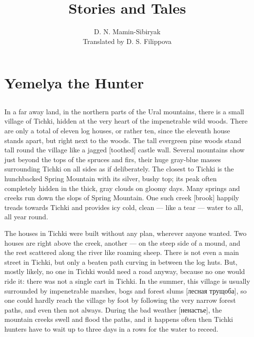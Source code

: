 \documentclass[b5paper,12pt,openany]{book}
\begin{document}
\title{Stories and Tales}
\author{D. N. Mamin-Sibiryak \\ Translated by D. S. Filippova}

\maketitle

\chapter{Yemelya the Hunter}

\section{}

In a far away land, in the northern parts of the Ural mountains, there is a small village of Tichki, hidden at the very heart of the impenetrable wild woods. There are only a total of eleven log houses, or rather ten, since the eleventh house stands apart, but right next to the woods.
The tall evergreen pine woods stand tall round the village like a jagged [toothed] castle wall.
Several mountains show just beyond the tops of the spruces and firs, their huge gray-blue masses  surrounding Tichki on all sides as if deliberately. The closest to Tichki is the hunchbacked Spring Mountain with its silver, bushy top; its peak often completely hidden in the thick, gray clouds on gloomy days. Many springs and creeks run down the slops of Spring Mountain. One such creek [brook] happily treads towards Tichki and provides icy cold, clean --- like a tear --- water to all, all year round.

The houses in Tichki were built without any plan, wherever anyone wanted. Two houses are right above the creek, another --- on the steep side of a mound, and the rest scattered along the river like roaming sheep. There is not even a main street in Tichki, but only a beaten path curving in between the log huts. But, mostly likely, no one in Tichki would need a road anyway, because no one would ride it: there was not a single cart in Tichki. In the summer, this village is usually surrounded by impenetrable marshes, bogs and forest slums [лесная трущоба], so one could hardly reach the village by foot by following the very narrow forest paths, and even then not always. During the bad weather [ненастье], the mountain creeks swell and flood the paths, and it happens often then Tichki hunters have to wait up to three days in a rows for the water to receed.
\end{document}
